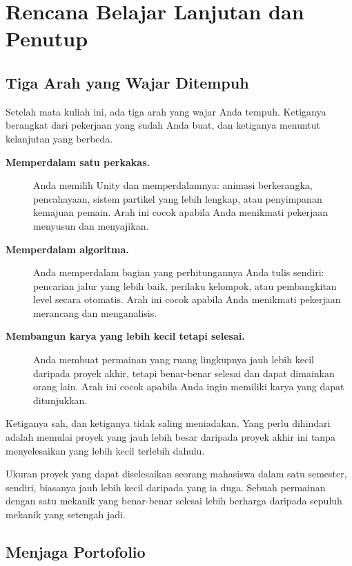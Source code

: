 \section{Rencana Belajar Lanjutan dan Penutup}
\label{sec:rencana-lanjut}

\subsection{Tiga Arah yang Wajar Ditempuh}

Setelah mata kuliah ini, ada tiga arah yang wajar Anda tempuh. Ketiganya
berangkat dari pekerjaan yang sudah Anda buat, dan ketiganya menuntut
kelanjutan yang berbeda.

\begin{description}
  \item[\textbf{Memperdalam satu perkakas.}] Anda memilih Unity dan
        memperdalamnya: animasi berkerangka, pencahayaan, sistem partikel yang
        lebih lengkap, atau penyimpanan kemajuan pemain. Arah ini cocok
        apabila Anda menikmati pekerjaan menyusun dan menyajikan.
  \item[\textbf{Memperdalam algoritma.}] Anda memperdalam bagian yang
        perhitungannya Anda tulis sendiri: pencarian jalur yang lebih baik,
        perilaku kelompok, atau pembangkitan level secara otomatis. Arah ini
        cocok apabila Anda menikmati pekerjaan merancang dan menganalisis.
  \item[\textbf{Membangun karya yang lebih kecil tetapi selesai.}] Anda
        membuat permainan yang ruang lingkupnya jauh lebih kecil daripada
        proyek akhir, tetapi benar-benar selesai dan dapat dimainkan orang
        lain. Arah ini cocok apabila Anda ingin memiliki karya yang dapat
        ditunjukkan.
\end{description}

Ketiganya sah, dan ketiganya tidak saling meniadakan. Yang perlu dihindari
adalah memulai proyek yang jauh lebih besar daripada proyek akhir ini tanpa
menyelesaikan yang lebih kecil terlebih dahulu.

\begin{tipsbox}
Ukuran proyek yang dapat diselesaikan seorang mahasiswa dalam satu semester,
sendiri, biasanya jauh lebih kecil daripada yang ia duga. Sebuah permainan
dengan satu mekanik yang benar-benar selesai lebih berharga daripada sepuluh
mekanik yang setengah jadi.
\end{tipsbox}

\subsection{Menjaga Portofolio}

